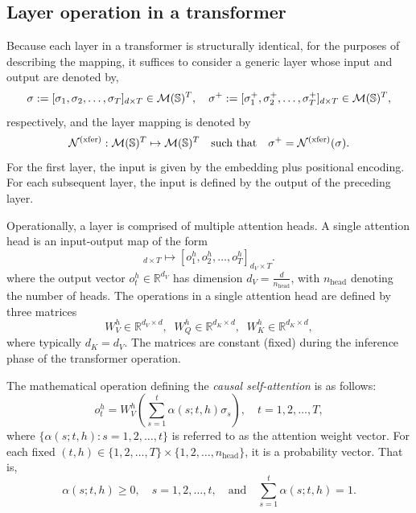 \documentclass[twoside,11pt]{article}
\def\Re{\mathbb{R}}
\newcommand{\field}[1]{\mathbb{#1}}
\def\Re{\field{R}}
\def\bS{\begin{slide}}
\def\Re{\mathbb{R}}
\renewcommand{\Re}{\mathbb{R}}
\def\bS{\mathbb{S}}
\def\xfer{{\text{\rm (xfer)}}}
\begin{document}
\subsection{Layer operation in a transformer}
Because each layer in a transformer is structurally identical, for the
purposes of describing the mapping, it suffices to consider a generic layer whose input
and output are denoted by,
\begin{equation*}
\sigma := [\sigma_1, \sigma_2,\hdots, \sigma_T]_{d\times T} \in  {\cal M}(\bS)^T,\quad \sigma^+:=
[\sigma^+_1, \sigma^+_2,\hdots, \sigma^+_T]_{d\times T} \in {\cal M}(\bS)^T,
\end{equation*}
respectively, and the layer mapping is denoted by
  \begin{equation*}
  {\cal N}^\xfer:{\cal M}(\bS)^T \mapsto {\cal M}(\bS)^T\quad
  \text{such that}\quad \sigma^+ = {\cal N}^\xfer(\sigma).
\end{equation*}
For the first layer, the input is given by the embedding plus
positional encoding.  For each subsequent layer, the input is defined
by the output of the preceding layer.


Operationally, a layer is comprised of multiple attention heads.  A single attention head is an input-output map of the form
  \begin{equation*}
  [\sigma_1, \sigma_2,\hdots, \sigma_T]_{d\times T} \mapsto
  [o_1^h,o_2^h,\hdots,o_T^h]_{d_V \times T}.
  \end{equation*}
  where the output vector $o_t^h \in\Re^{d_V}$ has
  dimension $d_V = \frac{d}{n_{\text{head}}}$, with $n_{\text{head}}$
  denoting the number of heads.
  The operations in a single attention head are defined by three matrices
  \begin{equation*}
  W_V^h \in \Re^{d_V \times d}, \;\;W_Q^h \in \Re^{d_K \times d}, \;\;W_K^h \in \Re^{d_K \times d},
  \end{equation*}
  where typically $d_K=d_V$. The matrices are constant (fixed) during
  the inference phase of the transformer operation.  

The mathematical operation defining the {\em causal self-attention} is as follows:
  \begin{equation}\label{eq:transf_output}
  o_t^h = W_V^h \left( \sum_{s=1}^t \alpha(s;t,h) \sigma_s\right),\quad t=1,2,\hdots, T,
  \end{equation}
  where $\{\alpha(s;t,h):s=1,2,\hdots,t\}$ is referred to as the
  attention weight vector.  For each fixed $(t,h)\in \{1,2,\hdots,T\}\times\{1,2,\hdots,
  {n_{\text{head}}}\}$, it is
  a probability vector.  That is,
\begin{equation*}
  \alpha(s;t,h)\geq 0,\quad s=1,2,\hdots,t,\quad \text{and}\quad 
  \sum_{s=1}^t \alpha(s;t,h)= 1.
  \end{equation*}
\end{document}
